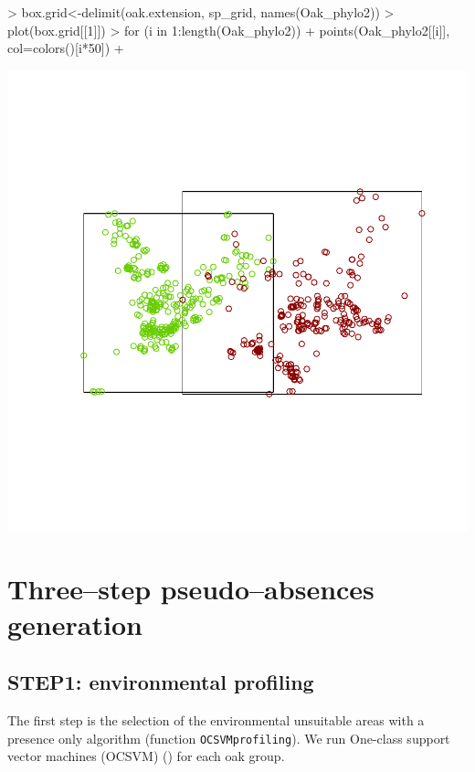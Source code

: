\documentclass[10pt,a4paper]{report}
\begin{document}
\begin{Schunk}
\begin{Sinput}
> box.grid<-delimit(oak.extension, sp_grid, names(Oak_phylo2))
> plot(box.grid[[1]])
> for (i in 1:length(Oak_phylo2)){
+   points(Oak_phylo2[[i]], col=colors()[i*50])
+ }
\end{Sinput}
\end{Schunk}
\includegraphics{mopa-mopa6}


\chapter{Three--step pseudo--absences generation}

 
\section{STEP1: environmental profiling}

The first step is the selection of the environmental unsuitable areas with a presence only algorithm (function \texttt{OCSVMprofiling}). We run One-class support vector machines (OCSVM) (\citet{scholkopf_learning_2001}) for each oak group.
\end{document}

